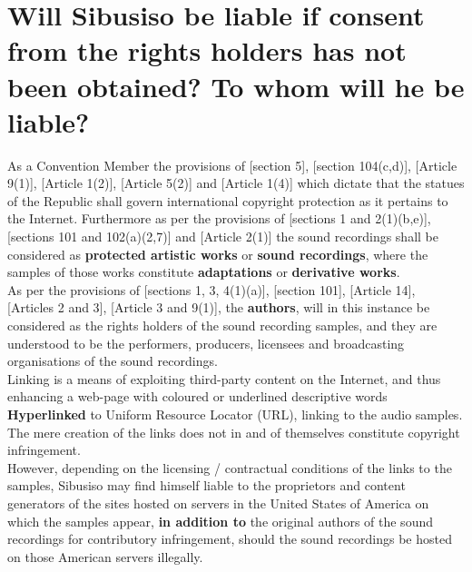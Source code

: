 \documentclass[11pt]{article}
\begin{document}
\section{Will Sibusiso be liable if consent from the rights holders has not been obtained? To whom will he be liable?}
\label{sec:org7425946}

As a Convention Member the provisions of [section 5]\cite{rsa78_copyrightact},
[section 104(c,d)]\cite{usa76_title17_us_copyright_act}, [Article
9(1)]\cite{wto17_trips}, [Article 1(2)]\cite{eurlex00_elec_commerce}, [Article
5(2)]\cite{wipo86_berne} and [Article 1(4)]\cite{wipo96_copyright_treaty} which
dictate that the statues of the Republic shall govern international copyright
protection as it pertains to the Internet. Furthermore as per the provisions of
[sections 1 and 2(1)(b,e)]\cite{rsa78_copyrightact}, [sections 101 and
102(a)(2,7)]\cite{usa76_title17_us_copyright_act} and [Article
2(1)]\cite{wipo86_berne} the sound recordings shall be considered as \textbf{protected
artistic works} or \textbf{sound recordings}, where the samples of those works
constitute \textbf{adaptations} or \textbf{derivative works}.\\

As per the provisions of [sections 1, 3, 4(1)(a)]\cite{rsa78_copyrightact},
[section 101]\cite{usa76_title17_us_copyright_act}, [Article 14]\cite{wto17_trips},
[Articles 2 and 3]\cite{wipo96_wppt}, [Article 3 and 9(1)]\cite{wipo86_berne}, the
\textbf{authors}, will in this instance be considered as the rights holders of the
sound recording samples, and they are understood to be the performers,
producers, licensees and broadcasting organisations of the sound recordings.\\

Linking is a means of exploiting third-party content on the Internet, and thus
enhancing a web-page with coloured or underlined descriptive words \textbf{Hyperlinked}
to Uniform Resource Locator (URL), linking to the audio samples. The mere
creation of the links does not in and of themselves constitute copyright
infringement.\\

However, depending on the licensing / contractual conditions of the links to the
samples, Sibusiso may find himself liable to the proprietors and content
generators of the sites hosted on servers in the United States of America on
which the samples appear, \textbf{in addition to} the original authors of the sound
recordings for contributory infringement, should the sound recordings be hosted
on those American servers illegally.
\end{document}

